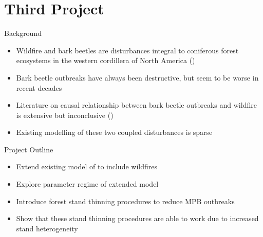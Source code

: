 \documentclass{beamer}
\begin{document}
\section{Third Project}
\begin{frame}{Background}
    \begin{itemize}
        \item Wildfire and bark beetles are disturbances integral to coniferous forest ecosystems in the western cordillera of North America (\cite{kaufmann2008status})
        \item Bark beetle outbreaks have always been destructive, but seem to be worse in recent decades
        \item Literature on causal relationship between bark beetle outbreaks and wildfire is extensive but inconclusive (\citet{axelson2009influence})
        \item Existing modelling of these two coupled disturbances is sparse
    \end{itemize}
\end{frame}

\begin{frame}{Project Outline}

    \begin{itemize}
        \item Extend existing model of \citet{duncan2015model} to include wildfires 
        \item Explore parameter regime of extended model
        \item Introduce forest stand thinning procedures to reduce MPB outbreaks
        \item Show that these stand thinning procedures are able to work due to increased stand heterogeneity 
    \end{itemize}
    
\end{frame}
\end{document}
